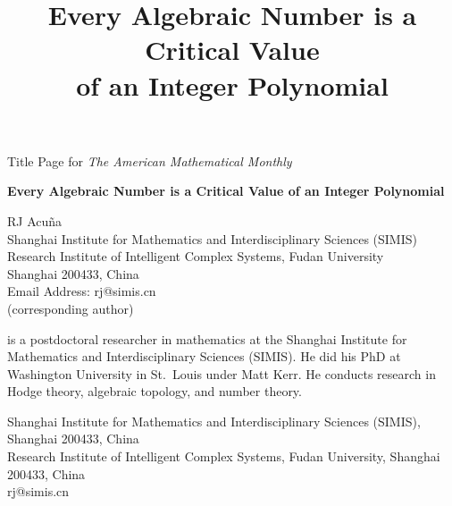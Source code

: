 \documentclass{article}
\newif\ifanonymous
\theoremstyle{theorem}
\theoremstyle{definition}
\begin{document}
\ifanonymous\else
\begin{center}
{\LARGE{Title Page for \textit{The American Mathematical Monthly}}}
\end{center}

\vspace{150px}
\begin{center}

\textbf{Every Algebraic Number is a Critical Value of an Integer Polynomial} \\
\vspace{25px}

RJ Acu\~na \\
Shanghai Institute for Mathematics and Interdisciplinary Sciences (SIMIS) \\
Research Institute of Intelligent Complex Systems, Fudan University \\
Shanghai 200433, China \\
Email Address: rj@simis.cn \\
(corresponding author)

\end{center}
\pagebreak
\fi

\title{Every Algebraic Number is a Critical Value\\ of an Integer Polynomial}
\author{}  %

\maketitle

\begin{abstract}

\end{abstract}

\vspace{10px}


\vspace{10px}






\ifanonymous\else
\begin{biog}
\item[RJ Acu\~na] is a postdoctoral researcher in mathematics at the
Shanghai Institute for Mathematics and Interdisciplinary Sciences (SIMIS). He
did his PhD at Washington University in St.~Louis under Matt Kerr. He
conducts research in Hodge theory, algebraic topology, and number theory.
\begin{affil}
Shanghai Institute for Mathematics and Interdisciplinary Sciences (SIMIS),
Shanghai 200433, China\\
Research Institute of Intelligent Complex Systems, Fudan University,
Shanghai 200433, China\\
rj@simis.cn
\end{affil}
\end{biog}
\fi

\vfill\eject
\end{document}
